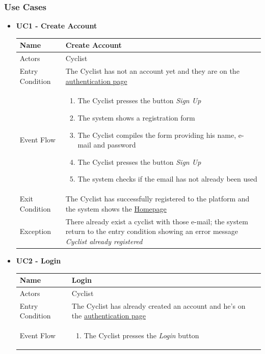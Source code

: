 \subsubsection{Use Cases}
\begin{itemize}
\item \textbf{UC1 - Create Account}\par\smallskip
\noindent
\begin{tabular}{|p{7cm}|p{7cm}|}
\hline
Name            & Create Account \\ \hline
Actors          & Cyclist\\ \hline
Entry Condition &  The Cyclist has not an account yet and they are on the \hyperref[fig:LoginSignUp]{authentication page}\\  \hline
Event Flow      &
\begin{enumerate}
    \item The Cyclist presses the button \textit{Sign Up}
    \item The system shows a registration form
    \item The Cyclist compiles the form providing his name, e-mail and password
    \item The Cyclist presses the button \textit{Sign Up}
    \item The system checks if the email has not already been used
\end{enumerate}
\\ \hline
Exit Condition  & The Cyclist has successfully registered to the platform and the system shows the \hyperref[fig:Homepage]{Homepage} \\ \hline
Exception       &  There already exist a cyclist with those e-mail; the system return to the entry condition showing an error message \textit{Cyclist already registered}\\ \hline
\end{tabular}
\bigskip
\item \textbf{UC2 - Login}\par\smallskip
\noindent
\begin{tabular}{|p{7cm}|p{7cm}|}
\hline
Name            & Login \\ \hline
Actors          & Cyclist \\ \hline
Entry Condition & The Cyclist has already created an account and he's on the \hyperref[fig:LoginSignUp]{authentication page} \\ \hline
Event Flow      &
\begin{enumerate}
    \item The Cyclist presses the \textit{Login} button

\end{enumerate}
\end{tabular}
\end{itemize}
